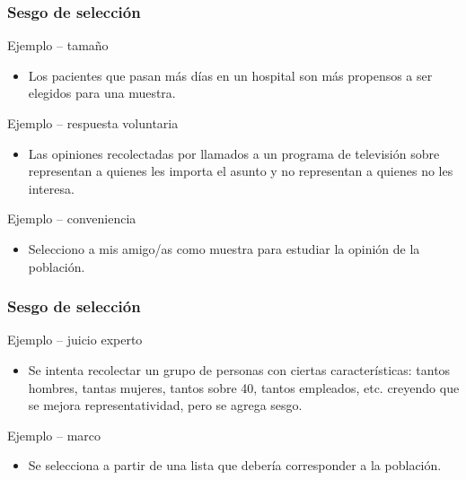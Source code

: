 \documentclass[table]{beamer}
\begin{document}
\begin{frame}
    \frametitle{Sesgo de selección}
    \begin{block}{Ejemplo -- tamaño}
        \begin{itemize}
            \item Los pacientes que pasan más días en un hospital son más propensos a ser elegidos para una muestra.
        \end{itemize}
    \end{block}
    \begin{block}{Ejemplo -- respuesta voluntaria}
        \begin{itemize}
            \item Las opiniones recolectadas por llamados a un programa de televisión sobre representan a quienes les importa el asunto y no representan a quienes no les interesa.
        \end{itemize}
    \end{block}
    \begin{block}{Ejemplo -- conveniencia}
        \begin{itemize}
            \item Selecciono a mis amigo/as como muestra para estudiar la opinión de la población.
        \end{itemize}
    \end{block}
\end{frame}

\begin{frame}
    \frametitle{Sesgo de selección}
    \begin{block}{Ejemplo -- juicio experto}
        \begin{itemize}
            \item Se intenta recolectar un grupo de personas con ciertas características: tantos hombres, tantas mujeres, tantos sobre 40, tantos empleados, etc. creyendo que se mejora representatividad, pero se agrega sesgo.
        \end{itemize}
    \end{block}
    \begin{block}{Ejemplo -- marco}
        \begin{itemize}
            \item Se selecciona a partir de una lista que debería corresponder a la población.
        \end{itemize}
    \end{block}
\end{frame}
\end{document}

